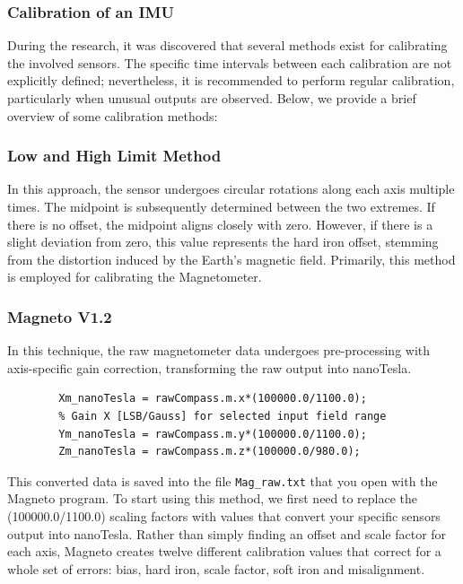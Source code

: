 \subsubsection{Calibration of an IMU}

During the research, it was discovered that several methods exist for calibrating the involved sensors. The specific time intervals between each calibration are not explicitly defined; nevertheless, it is recommended to perform regular calibration, particularly when unusual outputs are observed\cite{Mallon:2015}. Below, we provide a brief overview of some calibration methods:


\subsubsection{Low and High Limit Method}

In this approach, the sensor undergoes circular rotations along each axis multiple times. The midpoint is subsequently determined between the two extremes. If there is no offset, the midpoint aligns closely with zero. However, if there is a slight deviation from zero, this value represents the hard iron offset, stemming from the distortion induced by the Earth's magnetic field. Primarily, this method is employed for calibrating the Magnetometer.\cite{Mallon:2015}


\subsubsection{Magneto V1.2}

In this technique, the raw magnetometer data undergoes pre-processing with axis-specific gain correction, transforming the raw output into nanoTesla.

\begin{center}
	\begin{verbatim}
		Xm_nanoTesla = rawCompass.m.x*(100000.0/1100.0);
		% Gain X [LSB/Gauss] for selected input field range
		Ym_nanoTesla = rawCompass.m.y*(100000.0/1100.0);
		Zm_nanoTesla = rawCompass.m.z*(100000.0/980.0);
	\end{verbatim}
\end{center}

This converted data is saved into the file  \texttt{Mag\_raw.txt} that you open with the Magneto program. To start using this method, we first need to replace the (100000.0/1100.0)
scaling factors with values that convert your specific sensors output into nanoTesla.
Rather than simply finding an offset and scale factor for each axis, Magneto creates
twelve different calibration values that correct for a whole set of errors: bias, hard
iron, scale factor, soft iron and misalignment.

